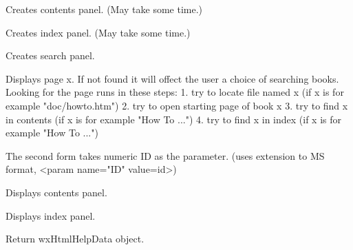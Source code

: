 \label{wxhtmlhelpframecreatecontents}


Creates contents panel. (May take some time.)


\label{wxhtmlhelpframecreateindex}


Creates index panel. (May take some time.)


\label{wxhtmlhelpframecreatesearch}


Creates search panel.


\label{wxhtmlhelpframedisplay}



Displays page x. If not found it will offect the user a choice of
searching books.
Looking for the page runs in these steps:
1. try to locate file named x (if x is for example "doc/howto.htm")
2. try to open starting page of book x
3. try to find x in contents (if x is for example "How To ...")
4. try to find x in index (if x is for example "How To ...")

The second form takes numeric ID as the parameter.
(uses extension to MS format, <param name="ID" value=id>)


\label{wxhtmlhelpframedisplaycontents}


Displays contents panel.

\label{wxhtmlhelpframedisplayindex}


Displays index panel.


\label{wxhtmlhelpframegetdata}


Return wxHtmlHelpData object.

